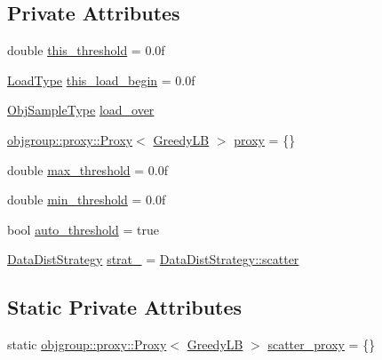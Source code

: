 \subsection*{Private Attributes}
\begin{DoxyCompactItemize}
\item 
double \hyperlink{structvt_1_1vrt_1_1collection_1_1lb_1_1_greedy_l_b_afd457b0829f152767e1aa5b07d7652ef}{this\+\_\+threshold} = 0.\+0f
\item 
\hyperlink{structvt_1_1vrt_1_1collection_1_1lb_1_1_base_l_b_a215e22b9f12678303f49615ae3be05cc}{Load\+Type} \hyperlink{structvt_1_1vrt_1_1collection_1_1lb_1_1_greedy_l_b_a95beecba794f8ac758242f1507a6d0ab}{this\+\_\+load\+\_\+begin} = 0.\+0f
\item 
\hyperlink{structvt_1_1vrt_1_1collection_1_1lb_1_1_base_l_b_a331d7da5bbf2883238427d86b54ddd7b}{Obj\+Sample\+Type} \hyperlink{structvt_1_1vrt_1_1collection_1_1lb_1_1_greedy_l_b_ae2701a450913d33bf8767164976b6e4c}{load\+\_\+over}
\item 
\hyperlink{structvt_1_1objgroup_1_1proxy_1_1_proxy}{objgroup\+::proxy\+::\+Proxy}$<$ \hyperlink{structvt_1_1vrt_1_1collection_1_1lb_1_1_greedy_l_b}{Greedy\+LB} $>$ \hyperlink{structvt_1_1vrt_1_1collection_1_1lb_1_1_greedy_l_b_ac121b6c8cafc463423b0ce7bdfb43806}{proxy} = \{\}
\item 
double \hyperlink{structvt_1_1vrt_1_1collection_1_1lb_1_1_greedy_l_b_a3134b75d2fd3ff63faa6a41b4c7b3dae}{max\+\_\+threshold} = 0.\+0f
\item 
double \hyperlink{structvt_1_1vrt_1_1collection_1_1lb_1_1_greedy_l_b_ae3d436ffc085fb846a1970018c593985}{min\+\_\+threshold} = 0.\+0f
\item 
bool \hyperlink{structvt_1_1vrt_1_1collection_1_1lb_1_1_greedy_l_b_a480ec7c5fa24215d70d34901f0549ff0}{auto\+\_\+threshold} = true
\item 
\hyperlink{namespacevt_1_1vrt_1_1collection_1_1lb_a0c49bf89a59ba0fd5160bc3894417dfa}{Data\+Dist\+Strategy} \hyperlink{structvt_1_1vrt_1_1collection_1_1lb_1_1_greedy_l_b_a41cd413b052ad6fb98fea034472fe31f}{strat\+\_\+} = \hyperlink{namespacevt_1_1vrt_1_1collection_1_1lb_a0c49bf89a59ba0fd5160bc3894417dfaa50894a237d9bcde0a18769af9a768baf}{Data\+Dist\+Strategy\+::scatter}
\end{DoxyCompactItemize}
\subsection*{Static Private Attributes}
\begin{DoxyCompactItemize}
\item 
static \hyperlink{structvt_1_1objgroup_1_1proxy_1_1_proxy}{objgroup\+::proxy\+::\+Proxy}$<$ \hyperlink{structvt_1_1vrt_1_1collection_1_1lb_1_1_greedy_l_b}{Greedy\+LB} $>$ \hyperlink{structvt_1_1vrt_1_1collection_1_1lb_1_1_greedy_l_b_a6be0a6b993320f141d5f94867511abfb}{scatter\+\_\+proxy} = \{\}
\end{DoxyCompactItemize}
